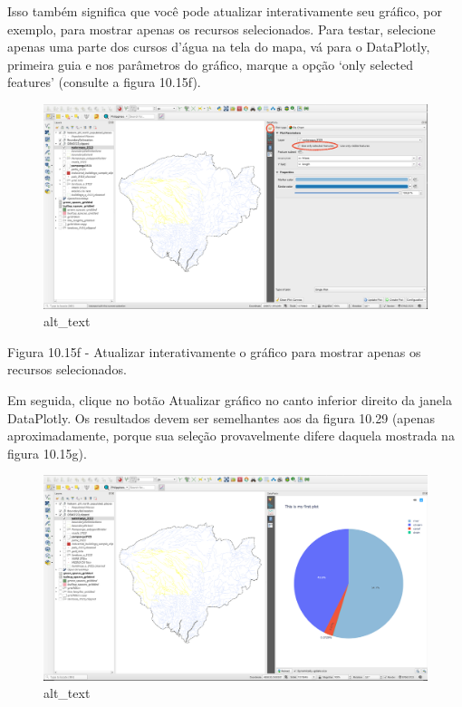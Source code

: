 \documentclass[
]{book}
\begin{document}
Isso também significa que você pode atualizar interativamente seu gráfico, por exemplo, para mostrar apenas os recursos selecionados. Para testar, selecione apenas uma parte dos cursos d'água na tela do mapa, vá para o DataPlotly, primeira guia e nos parâmetros do gráfico, marque a opção `only selected features' (consulte a figura 10.15f).

\begin{figure}
\centering
\includegraphics{media/modulo10/fig1015_f.png}
\caption{alt\_text}
\end{figure}

Figura 10.15f - Atualizar interativamente o gráfico para mostrar apenas os recursos selecionados.

Em seguida, clique no botão Atualizar gráfico no canto inferior direito da janela DataPlotly. Os resultados devem ser semelhantes aos da figura 10.29 (apenas aproximadamente, porque sua seleção provavelmente difere daquela mostrada na figura 10.15g).

\begin{figure}
\centering
\includegraphics{media/modulo10/fig1015_g.png}
\caption{alt\_text}
\end{figure}
\end{document}
